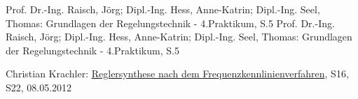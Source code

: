


%     
%         

\begin{thebibliography}{999}
 Prof. Dr.-Ing. Raisch, Jörg; Dipl.-Ing. Hess, Anne-Katrin; Dipl.-Ing. Seel, Thomas:
Grundlagen der Regelungstechnik - 4.Praktikum, S.5
 Prof. Dr.-Ing. Raisch, Jörg; Dipl.-Ing. Hess, Anne-Katrin; Dipl.-Ing. Seel, Thomas:
Grundlagen der Regelungstechnik - 4.Praktikum, S.5



Christian Krachler:
\href{http://www.krachler.com/fileadmin/user_upload/arbeiten/Reglersynthese_Christian_Krachler.pdf}{Reglersynthese nach dem Frequenzkennlinienverfahren}, S16, S22, 08.05.2012



\end{thebibliography}



